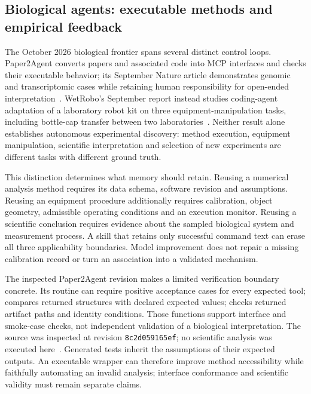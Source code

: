 \subsection{Biological agents: executable methods and empirical feedback}\label{sec:C24:biology}
The October 2026 biological frontier spans several distinct control loops. Paper2Agent converts papers and associated code into MCP interfaces and checks their executable behavior; its September Nature article demonstrates genomic and transcriptomic cases while retaining human responsibility for open-ended interpretation~\cite{miao2026paper2agent}. WetRobo's September report instead studies coding-agent adaptation of a laboratory robot kit on three equipment-manipulation tasks, including bottle-cap transfer between two laboratories~\cite{oikawa2026wetrobo}. Neither result alone establishes autonomous experimental discovery: method execution, equipment manipulation, scientific interpretation and selection of new experiments are different tasks with different ground truth.

This distinction determines what memory should retain. Reusing a numerical analysis method requires its data schema, software revision and assumptions. Reusing an equipment procedure additionally requires calibration, object geometry, admissible operating conditions and an execution monitor. Reusing a scientific conclusion requires evidence about the sampled biological system and measurement process. A skill that retains only successful command text can erase all three applicability boundaries. Model improvement does not repair a missing calibration record or turn an association into a validated mechanism.

The inspected Paper2Agent revision makes a limited verification boundary concrete. Its  routine can require positive acceptance cases for every expected tool;  compares returned structures with declared expected values;  checks returned artifact paths and identity conditions. Those functions support interface and smoke-case checks, not independent validation of a biological interpretation. The source was inspected at revision \texttt{8c2d059165ef}; no scientific analysis was executed here~\cite{paper2agent2026code}. Generated tests inherit the assumptions of their expected outputs. An executable wrapper can therefore improve method accessibility while faithfully automating an invalid analysis; interface conformance and scientific validity must remain separate claims.

